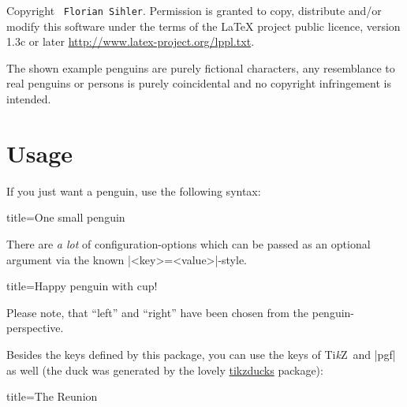 \documentclass[parskip=half,english,noenddot,numbers=noenddot,footnotes=nomultiple,oneside]{scrartcl}
\let\say\enquote
\def\TikZ{Ti\textit{k}Z}
\begin{document}
Copyright \textcopyright\ \texttt{Florian Sihler}. Permission is granted to copy, distribute and\slash or modify this software under the terms of the LaTeX project public licence, version 1.3c or later \url{http://www.latex-project.org/lppl.txt}.

The shown example penguins are purely fictional characters, any resemblance to real penguins or persons is purely coincidental and no copyright infringement is intended.

\section{Usage}

If you just want a penguin, use the following syntax:
\begin{tcblisting}{title={One small penguin}}
\begin{tikzpicture}
	\pingu
\end{tikzpicture}
\end{tcblisting}

There are \textit{a lot} of configuration-options which can be passed as an optional argument via the known |<key>=<value>|-style.
\begin{tcblisting}{title={Happy penguin with cup!}}
\end{tcblisting}
Please note, that \say{left} and \say{right} have been chosen from the penguin-perspective.

Besides the keys defined by this package, you can use the keys of \TikZ\ and |pgf| as well (the duck was generated by the lovely \href{https://github.com/samcarter/tikzducks}{tikzducks} package):
\begin{tcblisting}{title={The Reunion}}
\begin{tikzpicture}
	\duck
	\pingu[xshift=2.8cm, yshift=14mm,
	       eyes wink]
\end{tikzpicture}
\end{tcblisting}
\end{document}
